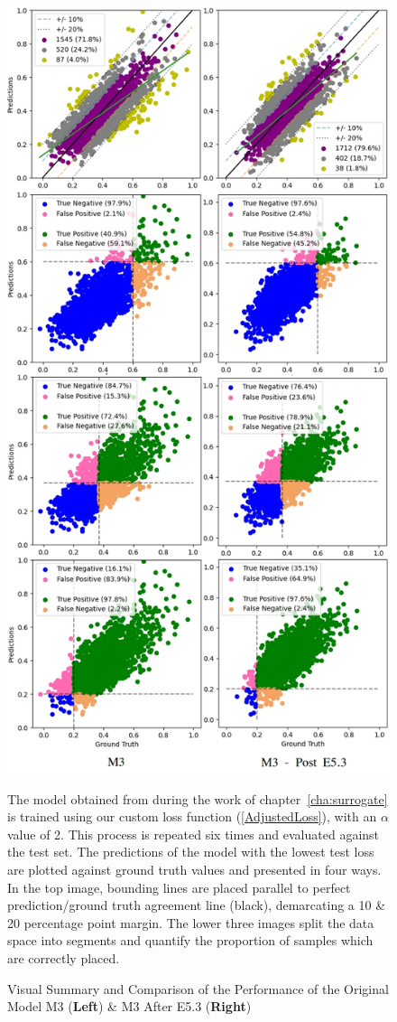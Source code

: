 \begin{figure}[p]
	\centering
	\includegraphics[scale=0.275]{Figures/m3_transfer_compare.jpg}
	\caption{Visual Summary and Comparison of the Performance of the Original Model M3 (\textbf{Left}) \& M3 After E5.3 (\textbf{Right})} {The model obtained from during the work of chapter~\ref{cha:surrogate} is trained using our custom loss function (\ref{AdjustedLoss}), with an $\alpha$ value of 2. This process is repeated six times and evaluated against the test set. The predictions of the model with the lowest test loss are plotted against ground truth values and presented in four ways. In the top image, bounding lines are placed parallel to perfect prediction/ground truth agreement line (black), demarcating a 10 \& 20 percentage point margin. The lower three images split the data space into segments and quantify the proportion of samples which are correctly placed.}
	\label{fig:m3_vs_5p3}
\end{figure}

